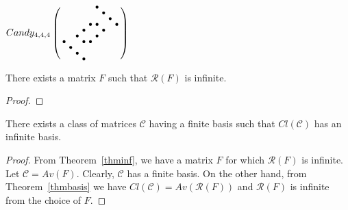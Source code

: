 $Candy_{4,4,4}\left(\begin{smallmatrix}
  &   &   &   &   & \bullet &   &   &   \\
  &   &   &   &   &   & \bullet &   &   \\
  &   &   &   &   &   &   & \bullet &   \\
  &   &   &   & \bullet & \bullet &   &   & \bullet \\
  &   &   & \bullet &   &   & \bullet &   &   \\
  &   & \bullet &   &   & \bullet &   &   &   \\
\bullet &   &   & \bullet & \bullet &   &   &   &   \\
  & \bullet &   &   &   &   &   &   &   \\
  &   & \bullet &   &   &   &   &   &   \\
  &   &   & \bullet &   &   &   &   & 
\end{smallmatrix}\right)$
\begin{thm}
\label{thminf}
There exists a matrix $F$ such that $\mathcal{R}(F)$ is infinite.
\end{thm}
\begin{proof}
\end{proof}
\begin{cor}
There exists a class of matrices $\mathcal{C}$ having a finite basis such that $Cl(\mathcal{C})$ has an infinite basis.
\end{cor}
\begin{proof}
From Theorem~\ref{thminf}, we have a matrix $F$ for which $\mathcal{R}(F)$ is infinite. Let $\mathcal{C}=Av(F)$. Clearly, $\mathcal{C}$ has a finite basis. On the other hand, from Theorem~\ref{thmbasis} we have $Cl(\mathcal{C})=Av(\mathcal{R}(F))$ and $\mathcal{R}(F)$ is infinite from the choice of $F$.
\end{proof}